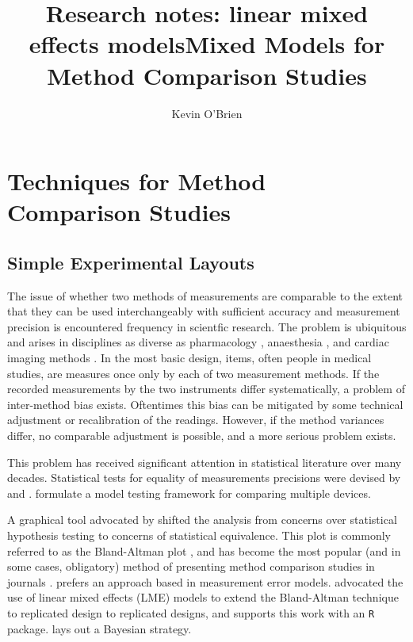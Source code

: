 \documentclass[12pt, a4paper]{report}
\title{Research notes: linear mixed effects models}
\author{ } \date{ }
\theoremstyle{plain}
\theoremstyle{definition}
\theoremstyle{remark}
\begin{document}
	\author{Kevin O'Brien}
	\title{Mixed Models for Method Comparison Studies}
	\tableofcontents
	
	\newpage
	
\chapter{Techniques for Method Comparison Studies}
\section{Simple Experimental Layouts}
The issue of whether two methods of measurements are 
comparable to the extent that they can be used 
interchangeably with sufficient accuracy and measurement precision is encountered frequency in scientfic research. The problem is ubiquitous and arises in disciplines
as diverse as pharmacology \citep{ludbrook97}, anaesthesia \citep{Myles}, and cardiac imaging methods \citep{Krumm}. In the most basic design, items, often people in medical studies, are measures once only by each of two measurement methods. 
If the recorded measurements by the two instruments differ systematically, a problem of inter-method bias exists. Oftentimes this bias can be mitigated by some technical adjustment or recalibration of the readings. However, if the method variances differ, no comparable adjustment is possible, and a more serious problem exists.


This problem has received significant attention in statistical literature over many decades.
Statistical tests for equality of measurements precisions were devised by \citet{pitman} and \citet{morgan}. \citet{Grubbs48,Grubbs73} formulate a model testing framework for comparing multiple devices.


A graphical tool advocated by \citet{BA83,BA86} shifted the analysis from concerns over statistical hypothesis testing to concerns of statistical equivalence. This plot is commonly referred to as the Bland-Altman plot \citep{Dewitte, Myles, krouwer2008bland, smith2010bar}, and has become the most popular (and in some cases, obligatory) method of presenting method comparison studies in journals \citep{BAcite}. \citet{DunnSEME} prefers an approach based in measurement error models. \citet{BXC2008} advocated the use of linear mixed effects (LME) models to extend the Bland-Altman technique to replicated design to replicated designs, and supports this work with an \texttt{R} package. \citet{broemeling2009} lays out a Bayesian strategy.
\end{document}
